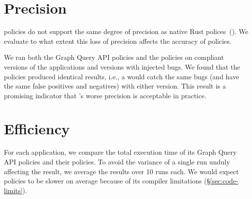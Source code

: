 \section{Precision}
\label{sec:precision}
\syslang{} policies do not support the same degree of precision as native Rust polices~().
%
We evaluate to what extent this loss of precision affects the accuracy of \syslang{} policies.

We ran both the Graph Query API policies and the \syslang{} policies on compliant versions of the applications and 
versions with injected bugs.
%
We found that the policies produced identical results, 
i.e., a \dev{} would catch the same bugs (and have the same false positives and negatives) with either version.
%
This result is a promising indicator that \syslang's worse precision is acceptable in practice.


\section{Efficiency}
\label{sec:efficiency}
For each application, we compare the total execution time of its Graph Query API policies
and their \syslang{} policies.
%
To avoid the variance of a single run unduly affecting the result, we average the results over 10 runs each.
%
We would expect \syslang{} policies to be slower on average because of its compiler limitations (\S\ref{sec:code-limits}).

